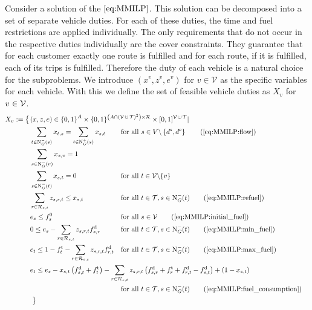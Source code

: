 Consider a solution of the $\eqref{eq:MMILP}$. This solution can be decomposed into a set of separate vehicle duties. For each of these duties, the time and fuel restrictions are applied individually. The only requirements that do not occur in the respective duties individually are the cover constraints. They guarantee that for each customer exactly one route is fulfilled and for each route, if it is fulfilled, each of its trips is fulfilled. Therefore the duty of each vehicle is a natural choice for the subproblems. We introduce $\left(x^v,z^v,e^v\right)$ for $v\in\mathcal{V}$ as the specific variables for each vehicle. With this we define the set of feasible vehicle duties as $X_v$ for $v\in\mathcal{V}$.
\begin{align}
	X_v := \left\{\vphantom{\{0,1\}^A}\right. & \omit\rlap{$\displaystyle{(x,z,e)\in\left\{0,1\right\}^A \times \{0,1\}^{\left(A\cap\left(\mathcal{V}\cupdot\mathcal{T}\right)^2\right)\times\mathcal{R}} \times [0,1]^{\mathcal{V}\cupdot\mathcal{T}}|}$} \nonumber \\
	& \sum_{t\in\Nin(s)} x_{t,s} = \sum_{t\in\Nout(s)} x_{s,t} && \text{for all } s\in V\backslash\left\{d^{\operatorname{s}},d^{\operatorname{e}}\right\} \tag{\ref{eq:MMILP:flow}} \\
	& \sum_{s\in\Nin(v)} x_{s,v} = 1 \label{eq:Xv:vehicle} \\
	& \sum_{s\in\Nin(t)} x_{s,t} = 0 && \text{for all } t\in\mathcal{V}\backslash\{v\} \label{eq:Xv:other_vehicles} \\
	& \sum_{r\in\Rst} z_{s,r,t} \leq x_{s,t} & & \text{for all } t\in\mathcal{T}, s\in\Nin(t) \tag{\ref{eq:MMILP:refuel}} \\
	& e_s \leq f_s^0 & & \text{for all } s\in\mathcal{V} \tag{\ref{eq:MMILP:initial_fuel}} \\
	& 0 \leq e_s - \sum_{r\in\Rst} z_{s,r,t}\fd_{s,r} & & \text{for all } t\in\mathcal{T}, s\in\Nin(t) \tag{\ref{eq:MMILP:min_fuel}} \\
	& e_t \leq 1 - \ft_t - \sum_{r\in\Rst} z_{s,r,t}\fd_{r,t} & & \text{for all } t\in\mathcal{T}, s\in\Nin(t) \tag{\ref{eq:MMILP:max_fuel}} \\
	& \omit\rlap{$\displaystyle{e_t \leq e_s - x_{s,t}\left(f_{s,t}^{\operatorname{d}}+f_t^{\operatorname{t}}\right) - \sum_{r\in\Rst} z_{s,r,t}\left(\fd_{s,r}+\ft_r+\fd_{r,t}-\fd_{s,t}\right) + \left(1-x_{s,t}\right)}$} \nonumber \\
	& & & \text{for all } t\in\mathcal{T}, s\in\Nin(t) \tag{\ref{eq:MMILP:fuel_consumption}} \\
	& \left. \vphantom{\{0,1\}^A} \right\} \nonumber
\end{align}

